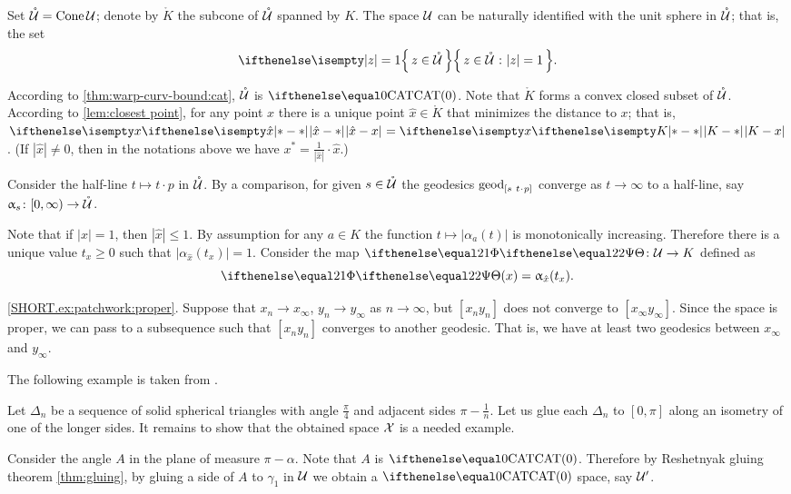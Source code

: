 Set $\mathring{\mathcal{U}}=\mathop{\rm Cone}\nolimits \mathcal{U}$;
denote by $\mathring{K}$ the subcone of $\mathring{\mathcal{U}}$ spanned by $K$.
The space $\mathcal{U}$ can be naturally identified with the unit sphere in $\mathring{\mathcal{U}}$;
that is, the set 
\[\set{z\in \mathring{\spc{U}}}{|z|=1}.\]

According to \ref{thm:warp-curv-bound:cat}, $\mathring{\mathcal{U}}$ is $\CAT0$.
Note that $\mathring{K}$ forms a convex closed subset of $\mathring{\mathcal{U}}$.
According to \ref{lem:closest point}, for any point $x$ there is a unique point $\hat x\in \mathring{K}$
that minimizes the distance to $x$;
that is, $\dist{\hat x}{x}{}=\dist{K}{x}{}$.
(If $|\hat x|\ne0$, then in the notations above we have
$x^*=\tfrac1{|\hat x|}\cdot\hat x$.)

Consider the half-line $t\mapsto t\cdot p$ in  $\mathring{\mathcal{U}}$.
By a comparison, 
for given $s\in \mathring{\spc{U}}$
the geodesics $\geod_{[s\ t\cdot p]}$ converge as $t\to\infty$ to a half-line, 
say $\alpha_s\:[0,\infty)\to \mathring{\spc{U}}$.



Note that if $|x|=1$, then $|\hat x|\le 1$.
By assumption for any $a\in K$ the function $t\mapsto |\alpha_a(t)|$ is monotonically increasing.
Therefore there is a unique value $t_x\ge 0$ such that
$|\alpha_{\hat x}(t_x)|=1$.
Consider the map $\map[2]\:\spc{U}\to K$
defined as 
\[\map[2](x)=\alpha_{\hat x}(t_x).\]

\parbf{\ref{ex:patchwork};} \ref{SHORT.ex:patchwork:proper}.
Suppose that $x_n\to x_\infty$, $y_n\to y_\infty$ as $n\to\infty$,
but $[x_ny_n]$ does not converge to $[x_\infty y_\infty]$.
Since the space is proper, we can pass to a subsequence such that $[x_ny_n]$ converges to another geodesic.
That is, we have at least two geodesics between $x_\infty$ and $y_\infty$.

 The following example is taken from \cite[Chapter I, Exercise 3.14]{bridson-haefliger}.

Let $\Delta_n$ be a sequence of solid spherical triangles 
with angle $\tfrac\pi4$ and adjacent sides $\pi-\tfrac1n$.
Let us glue each $\Delta_n$ to $[0,\pi]$ along an isometry of one of the longer sides.
It remains to show that the obtained space $\mathcal{X}$ is a needed example.

Consider the angle $A$ in the plane of measure $\pi-\alpha$.
Note that $A$ is $\CAT0$.
Therefore by Reshetnyak gluing theorem \ref{thm:gluing},
by gluing a side of $A$ to $\gamma_1$ in $\mathcal{U}$ we obtain a $\CAT0$ space, say $\mathcal{U}'$.

